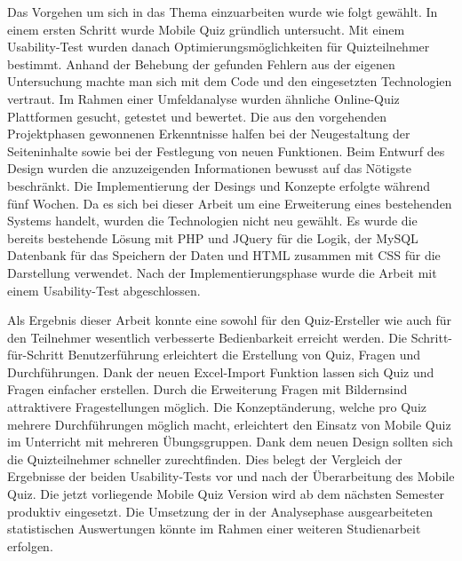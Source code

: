 Das Vorgehen um sich in das Thema einzuarbeiten wurde wie folgt gewählt. In einem ersten Schritt wurde Mobile Quiz gründlich untersucht. Mit einem \gls{Usability-Test} wurden danach Optimierungsmöglichkeiten für Quizteilnehmer bestimmt. Anhand der Behebung der gefunden Fehlern aus der eigenen Untersuchung machte man sich mit dem Code und den eingesetzten Technologien vertraut. Im Rahmen einer Umfeldanalyse wurden ähnliche Online-Quiz Plattformen gesucht, getestet und bewertet. Die aus den vorgehenden Projektphasen gewonnenen Erkenntnisse halfen bei der Neugestaltung der Seiteninhalte sowie bei der Festlegung von neuen Funktionen. Beim Entwurf des Design wurden die anzuzeigenden Informationen bewusst auf das Nötigste beschränkt. Die Implementierung der Desings und Konzepte erfolgte während fünf Wochen. Da es sich bei dieser Arbeit um eine Erweiterung eines bestehenden Systems handelt, wurden die Technologien nicht neu gewählt. Es wurde die bereits bestehende Lösung mit PHP und JQuery für die Logik, der MySQL Datenbank für das Speichern der Daten und HTML zusammen mit CSS für die Darstellung verwendet. Nach der Implementierungsphase wurde die Arbeit mit einem \gls{Usability-Test} abgeschlossen.

\bigskip

Als Ergebnis dieser Arbeit konnte eine sowohl für den Quiz-Ersteller wie auch für den Teilnehmer wesentlich verbesserte Bedienbarkeit erreicht werden. Die Schritt-für-Schritt Benutzerführung erleichtert die Erstellung von Quiz, Fragen und Durchführungen. Dank der neuen Excel-Import Funktion lassen sich Quiz und Fragen einfacher erstellen. Durch die Erweiterung \glqq Fragen mit Bildern\grqq sind attraktivere Fragestellungen möglich. Die Konzeptänderung, welche pro Quiz mehrere Durchführungen möglich macht, erleichtert den Einsatz von Mobile Quiz im Unterricht mit mehreren Übungsgruppen. Dank dem neuen Design sollten sich die Quizteilnehmer schneller zurechtfinden. Dies belegt der Vergleich der Ergebnisse der beiden \gls{Usability-Test}s vor und nach der Überarbeitung des Mobile Quiz. Die jetzt vorliegende Mobile Quiz Version wird ab dem nächsten Semester produktiv eingesetzt. Die Umsetzung der in der Analysephase ausgearbeiteten statistischen Auswertungen könnte im Rahmen einer weiteren Studienarbeit erfolgen.